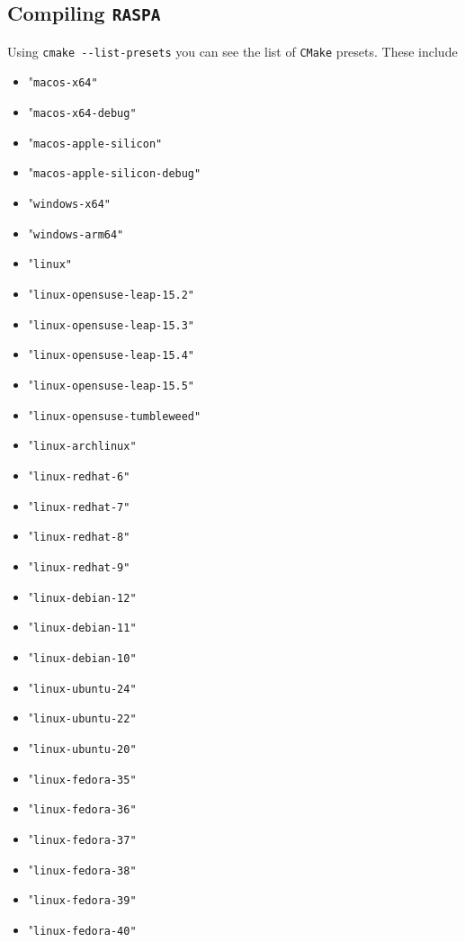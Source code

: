 \subsection{Compiling \texttt{RASPA}}

Using \verb+cmake --list-presets+ you can see the list of \texttt{CMake} presets.
These include
\begin{itemize}
  \item{"\texttt{macos-x64"}}
  \item{"\texttt{macos-x64-debug"}}
  \item{"\texttt{macos-apple-silicon"}}
  \item{"\texttt{macos-apple-silicon-debug"}}
  \item{"\texttt{windows-x64"}}
  \item{"\texttt{windows-arm64"}}
  \item{"\texttt{linux"}}
  \item{"\texttt{linux-opensuse-leap-15.2"}}
  \item{"\texttt{linux-opensuse-leap-15.3"}}
  \item{"\texttt{linux-opensuse-leap-15.4"}}
  \item{"\texttt{linux-opensuse-leap-15.5"}}
  \item{"\texttt{linux-opensuse-tumbleweed"}}
  \item{"\texttt{linux-archlinux"}}
  \item{"\texttt{linux-redhat-6"}}
  \item{"\texttt{linux-redhat-7"}}
  \item{"\texttt{linux-redhat-8"}}
  \item{"\texttt{linux-redhat-9"}}
  \item{"\texttt{linux-debian-12"}}
  \item{"\texttt{linux-debian-11"}}
  \item{"\texttt{linux-debian-10"}}
  \item{"\texttt{linux-ubuntu-24"}}
  \item{"\texttt{linux-ubuntu-22"}}
  \item{"\texttt{linux-ubuntu-20"}}
  \item{"\texttt{linux-fedora-35"}}
  \item{"\texttt{linux-fedora-36"}}
  \item{"\texttt{linux-fedora-37"}}
  \item{"\texttt{linux-fedora-38"}}
  \item{"\texttt{linux-fedora-39"}}
  \item{"\texttt{linux-fedora-40"}}
\end{itemize}

